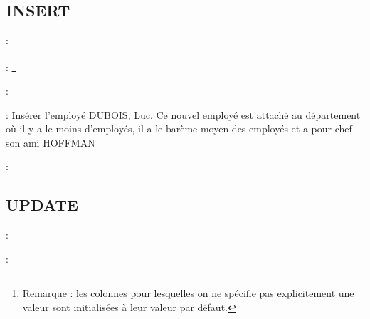 \documentclass[10pt]{beamer}
\begin{document}
\subsection{INSERT}
\begin{frame}{\secname : \subsecname}
    
\end{frame}

\begin{frame}{\secname : \subsecname}
    \footnote{Remarque : les colonnes pour lesquelles on ne spécifie pas explicitement une valeur sont initialisées à leur valeur par défaut.}
\end{frame}

\begin{frame}{\secname : \subsecname}
    
\end{frame}

\begin{frame}{\secname : \subsecname}
    Insérer l'employé DUBOIS, Luc.  Ce nouvel employé est attaché au département où il y a le moins d'employés, il a le barème moyen des employés et a pour chef son ami HOFFMAN
\end{frame}

\begin{frame}{\secname : \subsecname}
    
\end{frame}
\subsection{UPDATE}
\begin{frame}{\secname : \subsecname}
    
\end{frame}

\begin{frame}{\secname : \subsecname}
    
\end{frame}
\end{document}
